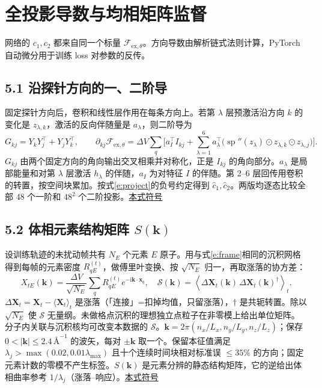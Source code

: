 \documentclass[UTF8,fontset=none,10pt,a4paper]{ctexart}
\newcommand{\ExT}{\mathcal F_{\mathrm{ex},\theta}}
\newcommand{\Ang}{\text{\AA}}
\newcommand{\sd}[1]{\hfill\mbox{\footnotesize\hyperlink{sym:#1}{本式符号}}\par}
\begin{document}
\section*{全投影导数与均相矩阵监督}
网络的 $c_1,c_2$ 都来自同一个标量 $\ExT$。方向导数由解析链式法则计算，PyTorch 自动微分用于训练 loss 对参数的反传。

\subsection*{5.1 沿探针方向的一、二阶导}
固定探针方向后，卷积和线性层作用在每条方向上。若第 $\lambda$ 层预激活沿方向 $k$ 的变化是 $z_{\lambda,k}$，激活的反向伴随量是 $a_\lambda$，则二阶导为
\begin{equation}\label{e:jet}
 G_{kj}=Y_kY_j^\top+Y_jY_k^\top,\qquad
 \partial_{kj}\ExT=\Delta V\sum_q
 \Big[a_I^\top I_{kj}
       +\sum_{\lambda=1}^6 a_\lambda^\top
          \big(\operatorname{sp}''(z_\lambda)\odot z_{\lambda,k}\odot z_{\lambda,j}\big)\Big].
\end{equation}
$G_{kj}$ 由两个固定方向的角向输出交叉相乘并对称化，正是 $I_{kj}$ 的角向部分。$a_\lambda$ 是局部能量和对第 $\lambda$ 层激活 $h_\lambda$ 的伴随，$a_I$ 为对特征 $I$ 的伴随。第 2–6 层回传用卷积的转置，按空间块累加。按式\eqref{e:project}的负号约定得到 $\widehat c_1,\widehat c_2$。两版均逐态比较全部 $48$ 个一阶和 $48^2$ 个二阶投影。\sd{e:jet}

\subsection*{5.2 体相元素结构矩阵 $S(\bm k)$}
设训练轨迹的未扰动帧共有 $N_E$ 个元素 $E$ 原子。用与式\eqref{e:frame}相同的沉积网格得到每帧的元素密度 $R^{(t)}_{qE}$，做傅里叶变换、按 $\sqrt{N_E}$ 归一，再取涨落的协方差：
\begin{equation}\label{e:elements}
 X_{tE}(\bm k)=\frac{\Delta V}{\sqrt{N_E}}\sum_q R^{(t)}_{qE}e^{-\mathrm i\bm k\cdot\bm x_q},
 \quad
 \mathcal S(\bm k)=\left\langle\Delta\bm X_t(\bm k)\,
                  \Delta\bm X_t(\bm k)^\dagger\right\rangle_t .
\end{equation}
$\Delta\bm X_t=\bm X_t-\langle\bm X_t\rangle_t$ 是涨落（「连接」=扣掉均值，只留涨落），$\dagger$ 是共轭转置。除以 $\sqrt{N_E}$ 使 $\mathcal S$ 无量纲。未做格点沉积的理想独立点粒子在非零模上给出单位矩阵。分子内关联与沉积核均可改变本数据的 $\mathcal S$。$\bm k=2\pi(n_x/L_x,n_y/L_y,n_z/L_z)$；保存 $0<|\bm k|\le2.4\,\Ang^{-1}$ 的波矢，每对 $\pm\bm k$ 取一个。保留本征值满足 $\lambda_j>\max(0.02,0.01\lambda_{\max})$ 且十个连续时间块相对标准误 $\le35\%$ 的方向；固定元素计数的零模不产生标签。$S(\bm k)$ 是元素分辨的静态结构矩阵，它的逆给出体相曲率参考 $1/\lambda_j$（涨落–响应）。\sd{e:elements}
\end{document}
